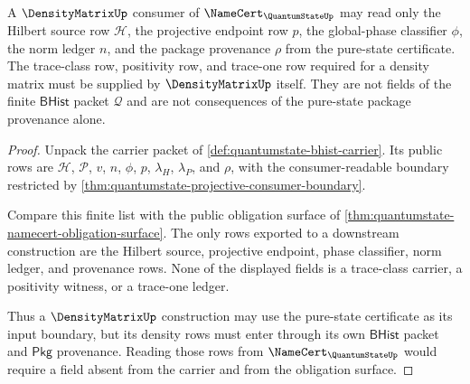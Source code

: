 \begin{theorem}
\label{thm:quantumstate-densitymatrix-consumer-exclusion}
A $\DensityMatrixUp$ consumer of $\NameCert_{\QuantumStateUp}$ may read only the
Hilbert source row $\mathcal{H}$, the projective endpoint row $p$, the
global-phase classifier $\phi$, the norm ledger $n$, and the package provenance
$\rho$ from the pure-state certificate. The trace-class row, positivity row, and
trace-one row required for a density matrix must be supplied by
$\DensityMatrixUp$ itself. They are not fields of the finite $\mathsf{BHist}$
packet $\mathcal{Q}$ and are not consequences of the pure-state package
provenance alone.
\end{theorem}
\begin{proof}
Unpack the carrier packet of \autoref{def:quantumstate-bhist-carrier}. Its
public rows are $\mathcal{H}$, $\mathcal{P}$, $v$, $n$, $\phi$, $p$,
$\lambda_H$, $\lambda_P$, and $\rho$, with the consumer-readable boundary
restricted by \autoref{thm:quantumstate-projective-consumer-boundary}.

Compare this finite list with the public obligation surface of
\autoref{thm:quantumstate-namecert-obligation-surface}. The only rows exported
to a downstream construction are the Hilbert source, projective endpoint, phase
classifier, norm ledger, and provenance rows. None of the displayed fields is a
trace-class carrier, a positivity witness, or a trace-one ledger.

Thus a $\DensityMatrixUp$ construction may use the pure-state certificate as its
input boundary, but its density rows must enter through its own $\mathsf{BHist}$
packet and $\mathsf{Pkg}$ provenance. Reading those rows from
$\NameCert_{\QuantumStateUp}$ would require a field absent from the carrier and
from the obligation surface.
\end{proof}


